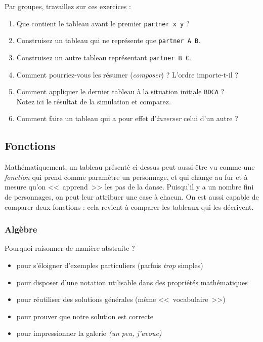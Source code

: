 \documentclass[11pt,a4paper,oneside]{book}
\begin{document}
Par groupes, travaillez sur ces exercices :
\begin{enumerate}
\item \boxes Que contient le tableau avant le premier \texttt{partner x y} ?
\item \boxes Construisez un tableau qui ne représente que \texttt{partner A B}.
\item \boxes Construisez un autre tableau représentant \texttt{partner B C}.
\item \boxes Comment pourriez-vous les résumer (\emph{composer}) ?
	L'ordre importe-t-il ?
\item \boxes Comment appliquer le dernier tableau à la
		situation initiale \texttt{BDCA} ? \\
	\boxes Notez ici le résultat de la simulation et comparez.
\item \boxes Comment faire un tableau qui a pour effet d'\emph{inverser} celui
	d'un autre ?
\end{enumerate}


\subsection{Fonctions}
Mathématiquement, un tableau présenté ci-dessus peut aussi être vu comme une
\emph{fonction} qui prend comme paramètre un personnage, et qui change au fur et
à mesure qu'on <<~apprend~>> les pas de la danse.
Puisqu'il y a un nombre fini de personnages, on peut leur attribuer une case à
chacun. On est aussi capable de comparer deux fonctions : cela revient à
comparer les tableaux qui les décrivent.

\subsubsection{Algèbre}
Pourquoi raisonner de manière abstraite ?
\begin{itemize}
\item pour s'éloigner d'exemples particuliers (parfois \emph{trop} simples)
\item pour disposer d'une notation utilisable dans des propriétés mathématiques
\item pour réutiliser des solutions générales (même <<~vocabulaire~>>)
\item pour prouver que notre solution est correcte
\item pour impressionner la galerie \emph{(un peu, j'avoue)}
\end{itemize}
\end{document}
